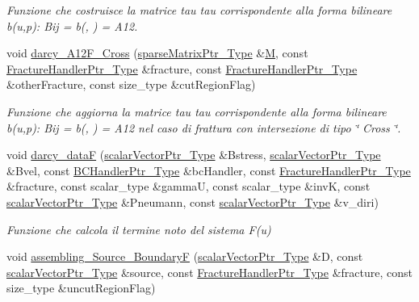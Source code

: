 \begin{DoxyCompactItemize}
\begin{DoxyCompactList}\small\item\em Funzione che costruisce la matrice tau tau corrispondente alla forma bilineare b(u,p)\-: Bij = b(, ) = A12. \end{DoxyCompactList}\item 
void \hyperlink{namespacegetfem_a88df6c0cb0765d5ab0fae27679cd30f4}{darcy\-\_\-\-A12\-F\-\_\-\-Cross} (\hyperlink{Core_8h_a87137a9501b38c724ac80bc955164bb7}{sparse\-Matrix\-Ptr\-\_\-\-Type} \&\hyperlink{matrici_8m_aa3fcd1f5ca38bf1f708720d0a9481e05}{M}, const \hyperlink{FractureHandler_8h_af23fb7a30aaff864bd42587af4f1e78a}{Fracture\-Handler\-Ptr\-\_\-\-Type} \&fracture, const \hyperlink{FractureHandler_8h_af23fb7a30aaff864bd42587af4f1e78a}{Fracture\-Handler\-Ptr\-\_\-\-Type} \&other\-Fracture, const size\-\_\-type \&cut\-Region\-Flag)
\begin{DoxyCompactList}\small\item\em Funzione che aggiorna la matrice tau tau corrispondente alla forma bilineare b(u,p)\-: Bij = b(, ) = A12 nel caso di frattura con intersezione di tipo \char`\"{} Cross \char`\"{}. \end{DoxyCompactList}\item 
void \hyperlink{namespacegetfem_ad6e90b309c01f6b4fc91c9369cba376a}{darcy\-\_\-data\-F} (\hyperlink{Core_8h_ab09b6fa3c23db1b8c60456f8690c44a7}{scalar\-Vector\-Ptr\-\_\-\-Type} \&Bstress, \hyperlink{Core_8h_ab09b6fa3c23db1b8c60456f8690c44a7}{scalar\-Vector\-Ptr\-\_\-\-Type} \&Bvel, const \hyperlink{BCHandler_8h_aa175884cb453788647f17f2230a2a762}{B\-C\-Handler\-Ptr\-\_\-\-Type} \&bc\-Handler, const \hyperlink{FractureHandler_8h_af23fb7a30aaff864bd42587af4f1e78a}{Fracture\-Handler\-Ptr\-\_\-\-Type} \&fracture, const scalar\-\_\-type \&gamma\-U, const scalar\-\_\-type \&inv\-K, const \hyperlink{Core_8h_ab09b6fa3c23db1b8c60456f8690c44a7}{scalar\-Vector\-Ptr\-\_\-\-Type} \&Pneumann, const \hyperlink{Core_8h_ab09b6fa3c23db1b8c60456f8690c44a7}{scalar\-Vector\-Ptr\-\_\-\-Type} \&v\-\_\-diri)
\begin{DoxyCompactList}\small\item\em Funzione che calcola il termine noto del sistema F(u) \end{DoxyCompactList}\item 
void \hyperlink{namespacegetfem_ac08fe08fb325eede94ffe4968b7980de}{assembling\-\_\-\-Source\-\_\-\-Boundary\-F} (\hyperlink{Core_8h_ab09b6fa3c23db1b8c60456f8690c44a7}{scalar\-Vector\-Ptr\-\_\-\-Type} \&D, const \hyperlink{Core_8h_ab09b6fa3c23db1b8c60456f8690c44a7}{scalar\-Vector\-Ptr\-\_\-\-Type} \&source, const \hyperlink{FractureHandler_8h_af23fb7a30aaff864bd42587af4f1e78a}{Fracture\-Handler\-Ptr\-\_\-\-Type} \&fracture, const size\-\_\-type \&uncut\-Region\-Flag)

\end{DoxyCompactItemize}
